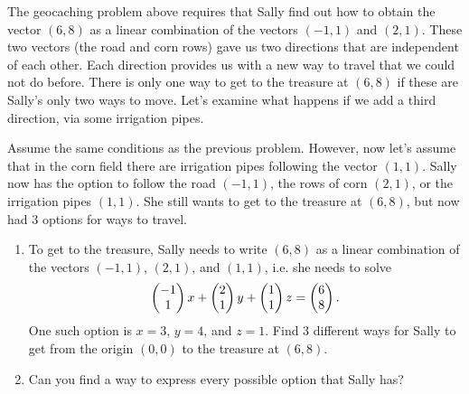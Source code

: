 The geocaching problem above requires that Sally find out how to obtain the vector $(6,8)$ as a linear combination of the vectors $(-1,1)$ and $(2,1)$.  These two vectors (the road and corn rows) gave us two directions that are independent of each other.  Each direction provides us with a new way to travel that we could not do before. There is only one way to get to the treasure at $(6,8)$ if these are Sally's only two ways to move. Let's examine what happens if we add a third direction, via some irrigation pipes.


\begin{problem}\label{salley in corn field with 3 directions}
 Assume the same conditions as the previous problem. However, now let's assume that in the corn field there are irrigation pipes following the vector $(1,1)$.  Sally now has the option to follow the road $(-1,1)$, the rows of corn $(2,1)$, or the irrigation pipes $(1,1)$. She still wants to get to the treasure at $(6,8)$, but now had 3 options for ways to travel. 
\begin{enumerate}
 \item To get to the treasure, Sally needs to write $(6,8)$ as a linear combination of the vectors $(-1,1)$, $(2,1)$, and $(1,1)$, i.e. she needs to solve
$$\begin{pmatrix} -1\\1 \end{pmatrix}x+\begin{pmatrix} 2\\1 \end{pmatrix}y+\begin{pmatrix} 1\\1 \end{pmatrix}z=\begin{pmatrix} 6\\8 \end{pmatrix}.$$ 
One such option is $x=3$, $y=4$, and $z=1$.   
Find 3 different ways for Sally to get from the origin $(0,0)$ to the treasure at $(6,8)$. 
 \item Can you find a way to express every possible option that Sally has?
\end{enumerate}
\end{problem}


